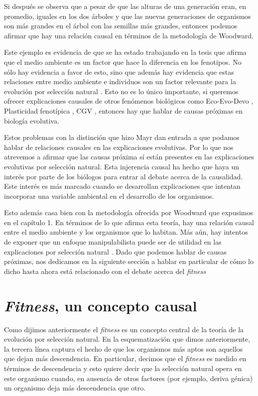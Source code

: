 Si después se observa que a pesar de que las alturas de una generación eran, en promedio, iguales en los dos árboles y que las nuevas generaciones de organismos son más grandes en el árbol con las semillas más grandes, entonces podemos afirmar que hay una relación causal en términos de la metodología de Woodward.

Este ejemplo es evidencia de que se ha estado trabajando en la tesis que afirma que el medio ambiente es un factor que hace la diferencia en los fenotipos. No sólo hay evidencia a favor de esto, sino que además hay evidencia que estas relaciones entre medio ambiente e individuos son un factor relevante para la evolución por selección natural \cite{Jablonka2020, Dayan2020, MacColl2011}. Esto no es lo único importante, si queremos ofrecer explicaciones causales de otros fenómenos biológicos como Eco-Evo-Devo \cite{PfenningEco-Evo-Devo}, Plasticidad fenotípica \cite{WESTEBERHARD20082701}, CGV \cite{CVG}, entonces hay que hablar de causas próximas en biología evolutiva.

Estos problemas con la distinción que hizo Mayr dan entrada a que podamos hablar de relaciones causales en las explicaciones evolutivas. Por lo que nos atrevemos a afirmar que las causas próxima sí están presentes en las explicaciones evolutivas por selección natural. Esta injerencia causal ha hecho que haya un interés por parte de los biólogos para entrar al debate acerca de la causalidad. Este interés es más marcado cuando se desarrollan explicaciones que intentan incorporar una variable ambiental en el desarrollo de los organismos.

Esto además casa bien con la metodología ofrecida por Woodward que expusimos en el capítulo 1. En términos de lo que afirma esta teoría, hay una relación causal entre el medio ambiente y los organismos que lo habitan. Más aún, hay intentos de exponer que un enfoque manipulabilista puede ser de utilidad en las explicaciones por selección natural \cite{MacColl2011}. Dado que podemos hablar de causas próximas, nos dedicamos en la siguiente sección a hablar en particular de cómo lo dicho hasta ahora está relacionado con el debate acerca del \emph{fitness}

\section{\emph{Fitness}, un concepto causal}

\noindent Como dijimos anteriormente el \emph{fitness} es un concepto central de la teoría de la evolución por selección natural. En la esquematización que dimos anteriormente, la tercera línea captura el hecho de que los organismos más aptos son aquellos que dejan más descendencia. En particular, decimos que el \emph{fitness} es medido en términos de descendencia y esto quiere decir que la selección natural opera en este organismo cuando, en ausencia de otros factores (por ejemplo, deriva génica) un organismo deja más descendencia que otro.

